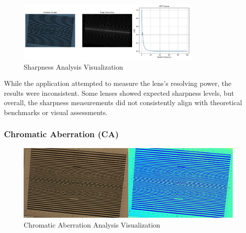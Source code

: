 \begin{figure}[H]
    \centering
    \includegraphics[width=0.8\textwidth]{Images/sharpness_analysis_20241211_224531.jpg}
    \caption{Sharpness Analysis Visualization}
    \label{fig:sharpness_analysis}
\end{figure}

While the application attempted to measure the lens's resolving power, the results were inconsistent. Some lenses showed expected sharpness levels, but overall, the sharpness measurements did not consistently align with theoretical benchmarks or visual assessments.

\subsubsection{Chromatic Aberration (CA)}
\begin{table}[H]
    \centering
    \caption{Chromatic Aberration Assessment Scores}
    \label{tab:ca_scores}
\end{table}



\begin{figure}[H]
    \centering
    \includegraphics[width=1\textwidth]{Images/ca_analysis_20241211_234543.jpg}
    \caption{Chromatic Aberration Analysis Visualization }
    \label{fig:ca_visualization}
\end{figure}

